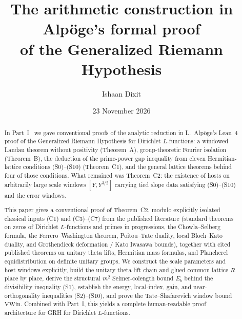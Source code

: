 \documentclass[11pt]{amsart}
\theoremstyle{plain}
\theoremstyle{definition}
\numberwithin{equation}{section}
\begin{document}
\title[The arithmetic construction in Alp\"oge's proof of GRH]{The arithmetic construction in Alp\"oge's formal proof\\ of the Generalized Riemann Hypothesis}

\author{Ishaan Dixit}
\address{Arizona State University, Tempe, AZ 85281, USA}

\date{23 November 2026}


\begin{abstract}
In Part~I~\cite{dixit-part1} we gave conventional proofs of the analytic reduction in
L.~Alp\"oge's Lean~4 proof of the Generalized Riemann Hypothesis for Dirichlet $L$-functions: a
windowed Landau theorem without positivity (Theorem~A), group-theoretic Fourier isolation
(Theorem~B), the deduction of the prime-power gap inequality from eleven Hermitian-lattice
conditions (S0)--(S10) (Theorem~C1), and the general lattice theorems behind four of those
conditions. What remained was Theorem~C2: the existence of hosts on arbitrarily large scale windows
$[Y,Y^{3/2}]$ carrying tied slope data satisfying (S0)--(S10) and the error windows.

This paper gives a conventional proof of Theorem~C2, modulo explicitly isolated
classical inputs \textup{(C1)} and \textup{(C3)--(C7)} from the published literature (standard
theorems on zeros of Dirichlet $L$-functions and primes in progressions, the Chowla--Selberg
formula, the Ferrero--Washington theorem, Poitou--Tate duality, local Bloch--Kato duality, and
Grothendieck deformation / Kato Iwasawa bounds), together with cited published theorems on
unitary theta lifts, Hermitian mass formulas, and Plancherel equidistribution on definite unitary
groups. We construct the scale parameters and host windows explicitly, build the unitary
theta-lift chain and glued common lattice $R$ place by place, derive the structural $m^2$
Selmer-colength bound $E_b$ behind the divisibility inequality (S1), establish the energy,
local-index, gain, and near-orthogonality inequalities (S2)--(S10), and prove the
Tate--Shafarevich window bound $\mathrm{VWin}$. Combined with Part~I, this yields a complete
human-readable proof architecture for GRH for Dirichlet $L$-functions.
\end{abstract}

\maketitle
\setcounter{tocdepth}{1}
\tableofcontents
\end{document}
